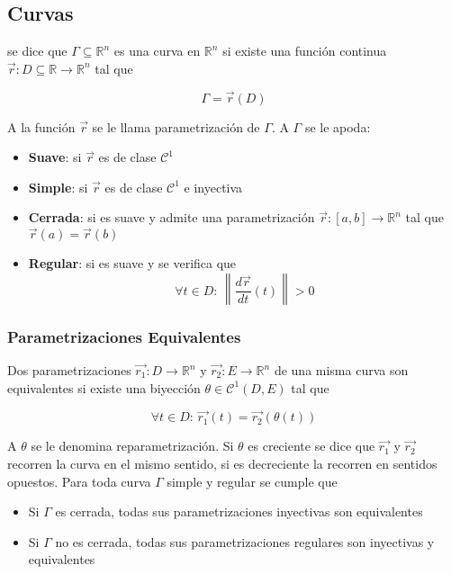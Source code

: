 \subsection{Curvas}

se dice que $\Gamma\subseteq\mathbb{R}^n$ es una curva en $\mathbb{R}^n$ si existe una función continua $\Vec{r}:D\subseteq\mathbb{R}\to\mathbb{R}^n$ tal que

\[\Gamma = \Vec{r}(D)\]

A la función $\Vec{r}$ se le llama parametrización de $\Gamma$. A $\Gamma$ se le apoda:

\begin{itemize}
    \item \textbf{Suave}: si $\Vec{r}$ es de clase $\mathcal{C}^1$
    \item \textbf{Simple}: si $\Vec{r}$ es de clase $\mathcal{C}^1$ e inyectiva
    \item \textbf{Cerrada}: si es suave y admite una parametrización $\Vec{r}:[a,b]\to\mathbb{R}^n$ tal que $\Vec{r}(a)=\Vec{r}(b)$
    \item \textbf{Regular}: si es suave y se verifica que
    \[\forall t\in D:\, \left\|\frac{d\Vec{r}}{dt}(t)\right\|>0\]
\end{itemize}

\subsubsection{Parametrizaciones Equivalentes}

Dos parametrizaciones $\Vec{r_1}:D\to\mathbb{R}^n$ y $\Vec{r_2}:E\to\mathbb{R}^n$ de una misma curva son equivalentes si existe una biyección $\theta\in\mathcal{C}^1(D,E)$ tal que

\[\forall t\in D:\, \Vec{r_1}(t) = \Vec{r_2}(\theta(t))\]

A $\theta$ se le denomina reparametrización. Si $\theta$ es creciente se dice que $\Vec{r_1}$ y $\Vec{r_2}$ recorren la curva en el mismo sentido, si es decreciente la recorren en sentidos opuestos.
\medbreak
Para toda curva $\Gamma$ simple y regular se cumple que

\begin{itemize}
    \item Si $\Gamma$ es cerrada, todas sus parametrizaciones inyectivas son equivalentes
    \item Si $\Gamma$ no es cerrada, todas sus parametrizaciones regulares son inyectivas y equivalentes
\end{itemize}

